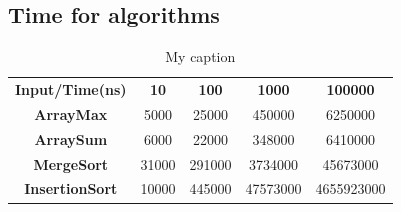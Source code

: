 \documentclass[a4paper,12pt]{article}
\begin{document}
    \subsection{Time for algorithms}
    \begin{table}[H]
      \centering
      \caption{My caption}
      \label{my-label}
      \begin{tabular}{ccccc}
        \hline
        \textbf{Input/Time(ns)} & \textbf{10} & \textbf{100} & \textbf{1000} & \textbf{100000} \\
        \textbf{ArrayMax}       & 5000        & 25000        & 450000        & 6250000         \\
        \textbf{ArraySum}       & 6000        & 22000        & 348000        & 6410000         \\
        \textbf{MergeSort}      & 31000       & 291000       & 3734000       & 45673000        \\
        \textbf{InsertionSort}  & 10000       & 445000       & 47573000      & 4655923000      \\ \hline
      \end{tabular}
    \end{table}
\end{document}
